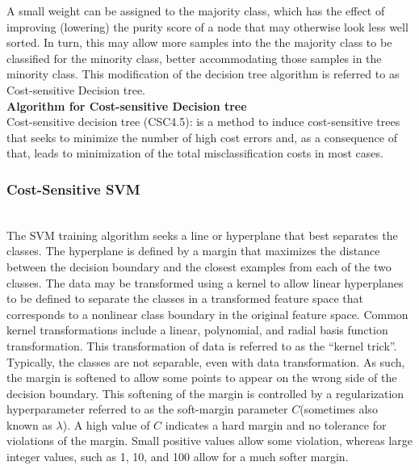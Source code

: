 A small weight can be assigned to the majority class, which has the effect of improving (lowering) the purity score of a node that may otherwise look less well sorted. In turn, this may allow more samples into the the majority class to be classified for the minority class, better accommodating those samples in the minority class.
This modification of the decision tree algorithm is referred to as Cost-sensitive Decision tree.\\


\textbf{Algorithm for Cost-sensitive Decision tree}\\
Cost-sensitive decision tree (CSC4.5): is a method to induce cost-sensitive trees that seeks to minimize the number of high cost errors and, as a consequence of that, leads to minimization of the total misclassification costs in most cases.



\subsubsection{Cost-Sensitive SVM}  \\
The SVM training algorithm seeks a line or hyperplane that best separates the classes. The hyperplane is defined by a margin that maximizes the distance between the decision boundary and the closest examples from each of the two classes.
The data may be transformed using a kernel to allow linear hyperplanes to be defined to separate the classes in a transformed feature space that corresponds to a nonlinear class boundary in the original feature space. Common kernel transformations  include a linear, polynomial, and radial basis function transformation. This transformation of data is referred to as the “kernel trick”.
Typically, the classes are not separable, even with data transformation. As such, the margin is softened to allow some points to appear on the wrong side of the decision boundary. This softening of the margin is controlled by a regularization hyperparameter referred to as the soft-margin parameter $C$(sometimes also known as $\lambda$).
A high value of $C$ indicates a hard margin and no tolerance for violations of the margin. Small positive values allow some violation, whereas large integer values, such as 1, 10, and 100 allow for a much softer margin. \\

